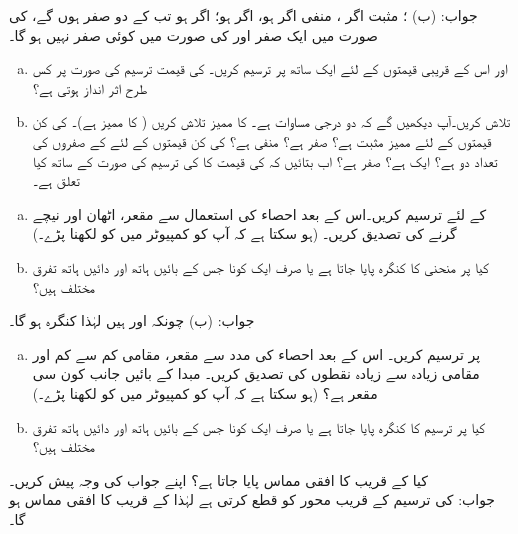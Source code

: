 جواب:\quad
(ب) ؛ مثبت اگر ، منفی اگر  ہو،  اگر  ہو؛ اگر  ہو تب  کے دو صفر ہوں گے،  کی صورت میں ایک صفر اور  کی صورت میں کوئی صفر نہیں ہو گا۔
\begin{enumerate}[a.]
\item
{} اور اس کے قریبی قیمتوں کے لئے  ایک ساتھ  پر  ترسیم کریں۔  کی قیمت ترسیم کی صورت پر کس طرح اثر انداز ہوتی ہے؟
\item
{} تلاش کریں۔آپ دیکھیں گے کہ  دو درجی مساوات ہے۔  کا ممیز تلاش کریں ( کا ممیز  ہے)۔  کی کن قیمتوں کے لئے ممیز مثبت ہے؟ صفر ہے؟ منفی ہے؟  کی کن قیمتوں کے لئے  کے  صفروں کی تعداد دو ہے؟ ایک ہے؟  صفر ہے؟ اب بتائیں کہ  کی قیمت کا  کی ترسیم کی صورت کے ساتھ کیا تعلق ہے۔
\end{enumerate}
\begin{enumerate}[a.]
\item
{} کے لئے  ترسیم کریں۔اس کے بعد احصاء کی استعمال سے مقعر، اٹھان اور نیچے گرنے کی تصدیق کریں۔ (ہو سکتا ہے کہ آپ کو کمپیوٹر میں  کو  لکھنا پڑے۔)
\item
کیا  پر منحنی کا کنگرہ پایا جاتا ہے یا صرف ایک کونا جس کے بائیں ہاتھ اور دائیں ہاتھ تفرق مختلف ہیں؟
\end{enumerate}
جواب:\quad
(ب) چونکہ  اور  ہیں لہٰذا کنگرہ ہو گا۔
\begin{enumerate}[a.]
\item
{} پر  ترسیم کریں۔ اس کے بعد احصاء کی مدد سے مقعر، مقامی کم سے کم اور مقامی زیادہ سے زیادہ نقطوں کی تصدیق کریں۔ مبدا کے بائیں جانب کون سی مقعر ہے؟ (ہو سکتا ہے کہ آپ کو کمپیوٹر میں  کو  لکھنا پڑے۔)
\item
کیا  پر ترسیم کا کنگرہ پایا  جاتا ہے یا صرف ایک کونا جس کے بائیں ہاتھ اور دائیں ہاتھ تفرق مختلف ہیں؟
\end{enumerate}
کیا  کے قریب  کا افقی مماس پایا جاتا ہے؟ اپنے جواب کی وجہ پیش کریں۔\\
جواب:\quad
{} کی ترسیم  کے قریب محور کو قطع کرتی ہے لہٰذا  کے قریب  کا افقی مماس ہو گا۔

